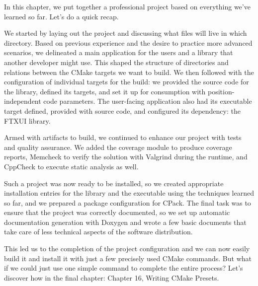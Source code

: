 In this chapter, we put together a professional project based on everything we’ve learned so far. Let’s do a quick recap.

We started by laying out the project and discussing what files will live in which directory. Based on previous experience and the desire to practice more advanced scenarios, we delineated a main application for the users and a library that another developer might use. This shaped the structure of directories and relations between the CMake targets we want to build. We then followed with the configuration of individual targets for the build: we provided the source code for the library, defined its targets, and set it up for consumption with position-independent code parameters. The user-facing application also had its executable target defined, provided with source code, and configured its dependency: the FTXUI library.

Armed with artifacts to build, we continued to enhance our project with tests and quality assurance. We added the coverage module to produce coverage reports, Memcheck to verify the solution with Valgrind during the runtime, and CppCheck to execute static analysis as well.

Such a project was now ready to be installed, so we created appropriate installation entries for the library and the executable using the techniques learned so far, and we prepared a package configuration for CPack. The final task was to ensure that the project was correctly documented, so we set up automatic documentation generation with Doxygen and wrote a few basic documents that take care of less technical aspects of the software distribution.

This led us to the completion of the project configuration and we can now easily build it and install it with just a few precisely used CMake commands. But what if we could just use one simple command to complete the entire process? Let’s discover how in the final chapter: Chapter 16, Writing CMake Presets.